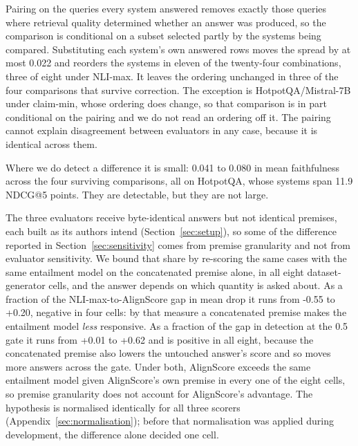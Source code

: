 \documentclass[11pt]{article}
\newcommand{\movedref}{Appendix}            %
\newcommand{\movedref}{Section}
\begin{document}
Pairing on the queries every system answered removes exactly those queries where retrieval quality determined whether an answer was produced, so the comparison is conditional on a subset selected partly by the systems being compared. Substituting each system's own answered rows moves the spread by at most 0.022 and reorders the systems in eleven of the twenty-four combinations, three of eight under NLI-max. It leaves the ordering unchanged in three of the four comparisons that survive correction. The exception is HotpotQA/Mistral-7B under claim-min, whose ordering does change, so that comparison is in part conditional on the pairing and we do not read an ordering off it. The pairing cannot explain disagreement between evaluators in any case, because it is identical across them.

Where we do detect a difference it is small: 0.041 to 0.080 in mean faithfulness across the four surviving comparisons, all on HotpotQA, whose systems span 11.9 NDCG@5 points. They are detectable, but they are not large.

The three evaluators receive byte-identical answers but not identical premises, each built as its authors intend (Section~\ref{sec:setup}), so some of the difference reported in Section~\ref{sec:sensitivity} comes from premise granularity and not from evaluator sensitivity. We bound that share by re-scoring the same cases with the same entailment model on the concatenated premise alone, in all eight dataset-generator cells, and the answer depends on which quantity is asked about. As a fraction of the NLI-max-to-AlignScore gap in mean drop it runs from -0.55 to +0.20, negative in four cells: by that measure a concatenated premise makes the entailment model \emph{less} responsive. As a fraction of the gap in detection at the 0.5 gate it runs from +0.01 to +0.62 and is positive in all eight, because the concatenated premise also lowers the untouched answer's score and so moves more answers across the gate. Under both, AlignScore exceeds the same entailment model given AlignScore's own premise in every one of the eight cells, so premise granularity does not account for AlignScore's advantage. The hypothesis is normalised identically for all three scorers (\movedref~\ref{sec:normalisation}); before that normalisation was applied during development, the difference alone decided one cell.
\end{document}
